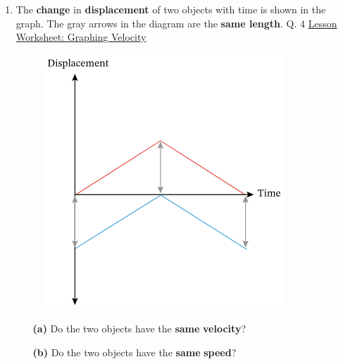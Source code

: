 \documentclass[A4,12pt]{article}
\begin{document}
\begin{enumerate}[label=\bfseries (\arabic*)]
\item The \textbf{change} in \textbf{displacement} of two objects with time is shown in the graph. The gray arrows in the diagram are the \textbf{same length}. \cite{Nagwa} Q. 4 \href{https://www.nagwa.com/en/worksheets/715142164735/}{Lesson Worksheet: Graphing Velocity}
%
\begin{figure}[H]
    \centering
    \includegraphics[scale=0.7]{Nagwa_Q4_disp.png}
\end{figure}
%
\begin{itemize}
    \item[\bf (a)] Do the two objects have the \textbf{same} \textbf{velocity}?
    
    \item[\bf (b)] Do the two objects have the \textbf{same} \textbf{speed}?
    

\end{itemize}
\end{enumerate}
\end{document}
